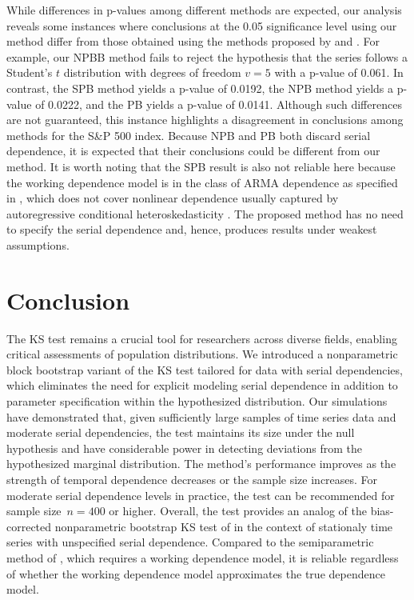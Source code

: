 \documentclass[12pt, titlepage, letterpaper]{article}
\begin{document}
While differences in p-values among different methods are expected, our analysis
reveals some instances where conclusions at the 0.05 significance level
using our method differ from those obtained using the methods proposed by
\citet{babu2004goodness} and \citet{zeimbekakis2022misuses}.
For example, our NPBB method fails to reject the
hypothesis that the series follows a Student's $t$ distribution with degrees of
freedom $v = 5$ with a p-value of 0.061. In contrast, 
the SPB method yields a p-value of 0.0192,
the NPB method yields a p-value of 0.0222, and the PB yields a p-value of
0.0141. Although such differences are not guaranteed, this
instance highlights a disagreement in conclusions among methods for the S\&P 500
index. Because NPB and PB both discard serial dependence, it is expected that
their conclusions could be different from our method. It is worth noting that
the SPB result is also not reliable here because the working dependence model is
in the class of ARMA dependence as specified in \citet{zeimbekakis2022misuses},
which does not cover nonlinear dependence usually captured by autoregressive
conditional heteroskedasticity \citep{engle1995arch}. The proposed method has
no need to specify the serial dependence and, hence, produces results under
weakest assumptions.



\section{Conclusion}
\label{sec:conclusion}

The KS test remains a crucial tool for researchers across diverse fields,
enabling critical assessments of population distributions. We introduced a
nonparametric block bootstrap variant of the KS test tailored for data with
serial dependencies, which eliminates the need for explicit modeling serial
dependence in addition to parameter specification within the hypothesized
distribution. Our simulations have demonstrated that, given
sufficiently large samples of time series data and moderate serial dependencies,
the test maintains its size under the null hypothesis and have considerable
power in detecting deviations from the hypothesized marginal distribution. The
method's performance improves as the strength of temporal dependence decreases
or the sample size increases. For moderate serial dependence levels in practice,
the test can be recommended for sample size~$n = 400$ or higher.
Overall, the test provides an analog of the bias-corrected nonparametric
bootstrap KS test of \citet{babu2004goodness} in the context of stationaly time
series with unspecified serial dependence. Compared to the semiparametric method
of \citet{zeimbekakis2022misuses}, which requires a working dependence model, it
is reliable regardless of whether the working dependence model approximates the
true dependence model.
\end{document}

